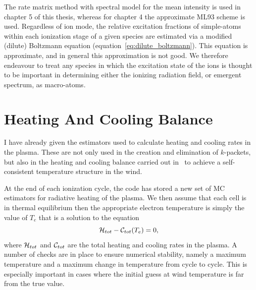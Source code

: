 The rate matrix method with spectral model for the mean intensity is used
in chapter 5 of this thesis, whereas for chapter 4 the approximate ML93 scheme is used.
Regardless of ion mode, the relative excitation fractions of simple-atoms
within each ionization stage of a given species are estimated via a modified (dilute) Boltzmann
equation (equation~\ref{eq:dilute_boltzmann}). This equation is approximate, and in 
general this approximation is not good. We therefore endeavour to treat any species in
which the excitation state of the ions is thought to be important
in determining either the ionizing radiation field, or emergent spectrum,
as macro-atoms.


\section{Heating And Cooling Balance}
\label{sec:heating_cooling}
I have already given the estimators used to calculate
heating and cooling rates in the plasma. These are not only used
in the creation and elimination of $k$-packets, but also in the heating
and cooling balance carried out in \py\ to achieve a self-consistent
temperature structure in the wind. 

At the end of each ionization cycle, the code has stored a new set
of MC estimators for radiative heating of the plasma. We then
assume that each cell is in thermal equilibrium then the appropriate
electron temperature is simply the value of $T_e$ that is a solution
to the equation
\begin{equation}
{\cal H}_{tot} - {\cal C}_{tot} ( T_e) = 0,
\end{equation}
where ${\cal H}_{tot}$ and ${\cal C}_{tot}$ are the total heating and cooling rates in 
the plasma. A number of checks are in place to ensure numerical stability,
namely a maximum temperature and a maximum change in temperature from cycle
to cycle. This is especially important in cases where the initial
guess at wind temperature is far from the true value.

